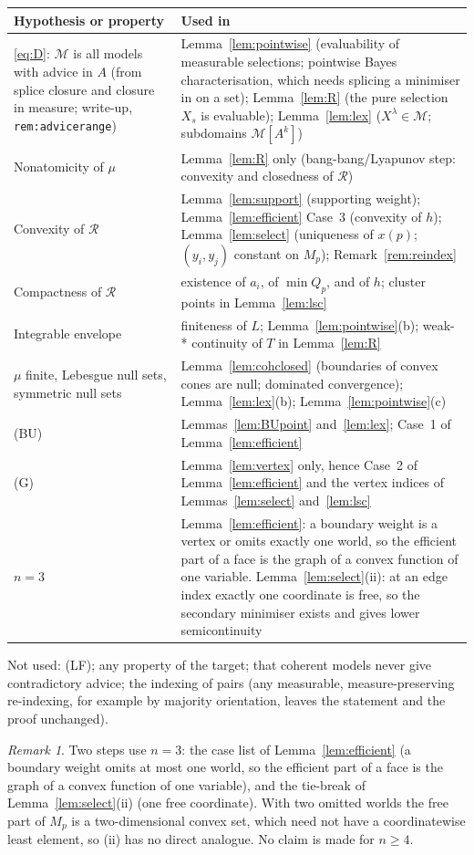 \documentclass[11pt]{article}
\theoremstyle{remark}
\newtheorem{remark}[theorem]{Remark}
\newcommand{\M}{\mathcal M}
\newcommand{\Rr}{\mathcal R}
\begin{document}
\begin{center}
\small
\begin{tabular}{@{}p{}p{}@{}}
\toprule
Hypothesis or property & Used in\\
\midrule
\eqref{eq:D}: $\M$ is all models with advice in $A$ (from splice closure and closure in measure; write-up, \texttt{rem:advicerange}) & Lemma~\ref{lem:pointwise} (evaluability of measurable selections; pointwise Bayes characterisation, which needs splicing a minimiser in on a set); Lemma~\ref{lem:R} (the pure selection $X_s$ is evaluable); Lemma~\ref{lem:lex} ($X^\lambda\in\M$; subdomains $\M[A^k]$)\\
Nonatomicity of $\mu$ & Lemma~\ref{lem:R} only (bang-bang/Lyapunov step: convexity and closedness of $\Rr$)\\
Convexity of $\Rr$ & Lemma~\ref{lem:support} (supporting weight); Lemma~\ref{lem:efficient} Case~3 (convexity of $h$); Lemma~\ref{lem:select} (uniqueness of $x(p)$; $(y_i,y_j)$ constant on $M_p$); Remark~\ref{rem:reindex}\\
Compactness of $\Rr$ & existence of $a_i$, of $\min Q_p$, and of $h$; cluster points in Lemma~\ref{lem:lsc}\\
Integrable envelope & finiteness of $L$; Lemma~\ref{lem:pointwise}(b); weak-* continuity of $T$ in Lemma~\ref{lem:R}\\
$\mu$ finite, Lebesgue null sets, symmetric null sets & Lemma~\ref{lem:cohclosed} (boundaries of convex cones are null; dominated convergence); Lemma~\ref{lem:lex}(b); Lemma~\ref{lem:pointwise}(c)\\
(BU) & Lemmas~\ref{lem:BUpoint} and~\ref{lem:lex}; Case~1 of Lemma~\ref{lem:efficient}\\
(G) & Lemma~\ref{lem:vertex} only, hence Case~2 of Lemma~\ref{lem:efficient} and the vertex indices of Lemmas~\ref{lem:select} and~\ref{lem:lsc}\\
$n=3$ & Lemma~\ref{lem:efficient}: a boundary weight is a vertex or omits exactly one world, so the efficient part of a face is the graph of a convex function of one variable. Lemma~\ref{lem:select}(ii): at an edge index exactly one coordinate is free, so the secondary minimiser exists and gives lower semicontinuity\\
\bottomrule
\end{tabular}
\end{center}

\noindent Not used: (LF); any property of the target; that coherent models never give contradictory advice; the indexing of pairs (any measurable, measure-preserving re-indexing, for example by majority orientation, leaves the statement and the proof unchanged).

\begin{remark}\label{rem:ngeq4}
Two steps use $n=3$: the case list of Lemma~\ref{lem:efficient} (a boundary weight omits at most one world, so the efficient part of a face is the graph of a convex function of one variable), and the tie-break of Lemma~\ref{lem:select}(ii) (one free coordinate). With two omitted worlds the free part of $M_p$ is a two-dimensional convex set, which need not have a coordinatewise least element, so (ii) has no direct analogue. No claim is made for $n\ge4$.
\end{remark}
\end{document}

